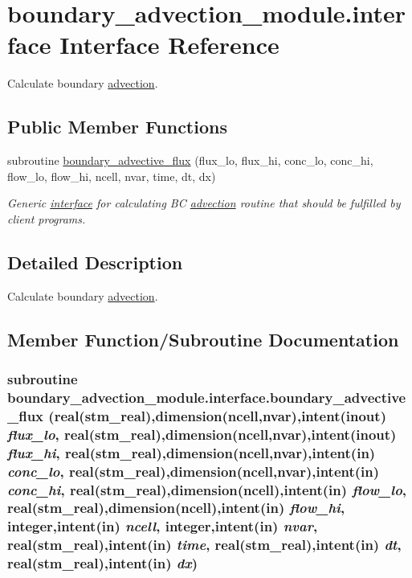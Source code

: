 \hypertarget{a00004}{
\section{boundary\_\-advection\_\-module.interface Interface Reference}
\label{a00004}
}
Calculate boundary \hyperlink{a00052}{advection}.  


\subsection*{Public Member Functions}
\begin{CompactItemize}
\item 
subroutine \hyperlink{a00004_9661c190a54a2f469a05deca67aa067c}{boundary\_\-advective\_\-flux} (flux\_\-lo, flux\_\-hi, conc\_\-lo, conc\_\-hi, flow\_\-lo, flow\_\-hi, ncell, nvar, time, dt, dx)
\begin{CompactList}\small\item\em Generic \hyperlink{a00004}{interface} for calculating BC \hyperlink{a00052}{advection} routine that should be fulfilled by client programs. \item\end{CompactList}\end{CompactItemize}


\subsection{Detailed Description}
Calculate boundary \hyperlink{a00052}{advection}. 

\subsection{Member Function/Subroutine Documentation}
\hypertarget{a00004_9661c190a54a2f469a05deca67aa067c}{
\subsubsection[{boundary\_\-advective\_\-flux}]{\setlength{\rightskip}{0pt plus 5cm}subroutine boundary\_\-advection\_\-module.interface.boundary\_\-advective\_\-flux (real(stm\_\-real),dimension(ncell,nvar),intent(inout) {\em flux\_\-lo}, \/  real(stm\_\-real),dimension(ncell,nvar),intent(inout) {\em flux\_\-hi}, \/  real(stm\_\-real),dimension(ncell,nvar),intent(in) {\em conc\_\-lo}, \/  real(stm\_\-real),dimension(ncell,nvar),intent(in) {\em conc\_\-hi}, \/  real(stm\_\-real),dimension(ncell),intent(in) {\em flow\_\-lo}, \/  real(stm\_\-real),dimension(ncell),intent(in) {\em flow\_\-hi}, \/  integer,intent(in) {\em ncell}, \/  integer,intent(in) {\em nvar}, \/  real(stm\_\-real),intent(in) {\em time}, \/  real(stm\_\-real),intent(in) {\em dt}, \/  real(stm\_\-real),intent(in) {\em dx})}}
\label{a00004_9661c190a54a2f469a05deca67aa067c}


